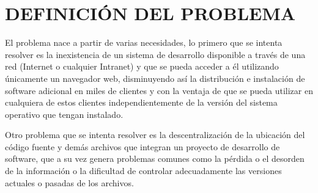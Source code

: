 \section{DEFINICIÓN DEL PROBLEMA}

El problema nace a partir de varias necesidades, lo primero que se intenta resolver es la inexistencia de un sistema de desarrollo disponible a través de una red (Internet o cualquier Intranet) y que se pueda acceder a él utilizando únicamente un navegador web, disminuyendo así la distribución e instalación de software adicional en miles de clientes y con la ventaja de que se pueda utilizar en cualquiera de estos clientes independientemente de la versión del sistema operativo que tengan instalado.

Otro problema que se intenta resolver es la descentralización de la ubicación del código fuente y demás archivos que integran un proyecto de desarrollo de software, que a su vez genera problemas comunes como la pérdida o el desorden de la información o la dificultad de controlar adecuadamente las versiones actuales o pasadas de los archivos.
